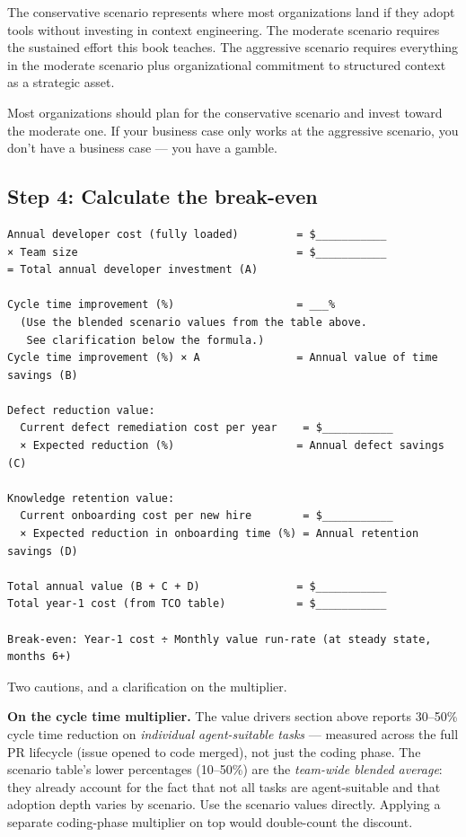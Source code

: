 \documentclass[
  a4paper,
  DIV=11,
  numbers=noendperiod]{scrreprt}
\begin{document}
The conservative scenario represents where most organizations land if
they adopt tools without investing in context engineering. The moderate
scenario requires the sustained effort this book teaches. The aggressive
scenario requires everything in the moderate scenario plus
organizational commitment to structured context as a strategic asset.

Most organizations should plan for the conservative scenario and invest
toward the moderate one. If your business case only works at the
aggressive scenario, you don't have a business case --- you have a
gamble.

\subsection{Step 4: Calculate the
break-even}\label{step-4-calculate-the-break-even}

\begin{verbatim}
Annual developer cost (fully loaded)         = $___________
× Team size                                  = $___________
= Total annual developer investment (A)

Cycle time improvement (%)                   = ___%
  (Use the blended scenario values from the table above.
   See clarification below the formula.)
Cycle time improvement (%) × A               = Annual value of time savings (B)

Defect reduction value:
  Current defect remediation cost per year    = $___________
  × Expected reduction (%)                   = Annual defect savings (C)

Knowledge retention value:
  Current onboarding cost per new hire        = $___________
  × Expected reduction in onboarding time (%) = Annual retention savings (D)

Total annual value (B + C + D)               = $___________
Total year-1 cost (from TCO table)           = $___________

Break-even: Year-1 cost ÷ Monthly value run-rate (at steady state, months 6+)
\end{verbatim}

Two cautions, and a clarification on the multiplier.

\textbf{On the cycle time multiplier.} The value drivers section above
reports 30--50\% cycle time reduction on \emph{individual agent-suitable
tasks} --- measured across the full PR lifecycle (issue opened to code
merged), not just the coding phase. The scenario table's lower
percentages (10--50\%) are the \emph{team-wide blended average}: they
already account for the fact that not all tasks are agent-suitable and
that adoption depth varies by scenario. Use the scenario values
directly. Applying a separate coding-phase multiplier on top would
double-count the discount.
\end{document}
